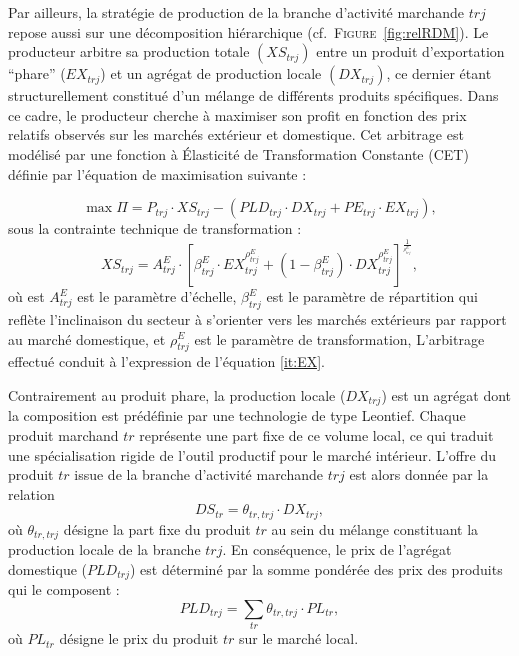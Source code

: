 \documentclass[11pt,a4paper]{article}
\newcommand{\trj}{\mathit{trj}}
\newcommand{\DX}{\mathit{DX}}
\newcommand{\DS}{\mathit{DS}}
\newcommand{\EX}{\mathit{EX}}
\newcommand{\PE}{\mathit{PE}}
\newcommand{\PLD}{\mathit{PLD}}
\newcommand{\PL}{\mathit{PL}}
\newcommand{\tr}{\mathit{tr}}
\newcommand{\XS}{\mathit{XS}}
\begin{document}
	\begin{figure}[!htbp]
		\centering
		
	\end{figure}
	
	Par ailleurs, la stratégie de production de la branche d'activité marchande $\trj$ repose aussi sur une décomposition hiérarchique (cf.~\textsc{Figure}~\ref{fig:relRDM}). Le producteur arbitre sa production totale $\left(\XS_{\trj}\right)$ entre un produit d'exportation ``phare'' ($\EX_{\trj}$) et un agrégat de production locale $\left(\DX_{\trj}\right)$, ce dernier étant structurellement constitué d'un mélange de différents produits spécifiques. Dans ce cadre, le producteur cherche à maximiser son profit en fonction des prix relatifs observés sur les marchés extérieur et domestique. Cet arbitrage est modélisé par une fonction à {Élasticité de Transformation Constante (CET)} définie par l'équation de maximisation suivante :
	
	\begin{equation*}
		\max \Pi = P_{\trj} \cdot \XS_{\trj} - \left( \PLD_{\trj} \cdot \DX_{\trj} + \PE_{\trj} \cdot \EX_{\trj} \right),
	\end{equation*}
	sous la contrainte technique de transformation :
	\begin{equation*}
		\XS_{\trj} = A_{\trj}^E \cdot \left[\beta_{\trj}^E\cdot\EX_{\trj}^{\rho_{\trj}^E} + \left(1 - \beta_{\trj}^E\right)\cdot \DX_{\trj}^{\rho_{\trj}^E}\right]^{\frac{1}{^{\rho_{\trj}^E}}},
	\end{equation*}
	où est $A_{\trj}^E$ est le paramètre d'échelle, $\beta_{\trj}^E$ est le paramètre de répartition qui reflète l'inclinaison du secteur à s'orienter vers les marchés extérieurs par rapport au marché domestique, et $\rho_{\trj}^E$ est le paramètre de transformation,
	L'arbitrage effectué conduit à l'expression de l'équation \ref{it:EX}.
	
	Contrairement au produit phare, la production locale ($\DX_{\trj}$) est un agrégat dont la composition est prédéfinie par une technologie de type Leontief. Chaque produit marchand $\tr$ représente une part fixe de ce volume local, ce qui traduit une spécialisation rigide de l'outil productif pour le marché intérieur. L'offre du produit $\tr$ issue de la branche d'activité marchande $\trj$ est alors donnée par la relation
	\begin{equation*}
		\DS_{\tr} = \theta_{\tr, \trj} \cdot \DX_{\trj},
	\end{equation*}
	où $\theta_{\tr, \trj}$ désigne la part fixe du produit $\tr$ au sein du mélange constituant la production locale de la branche $\trj$. En conséquence, le prix de l'agrégat domestique ($\PLD_{\trj}$) est déterminé par la somme pondérée des prix des produits qui le composent :
	\begin{equation*}
		\PLD_{\trj} = \sum_{\tr} \theta_{\tr, \trj} \cdot \PL_{\tr},
	\end{equation*}
	où $\PL_{\tr}$ désigne le prix du produit $\tr$ sur le marché local. 
	
\end{document}
